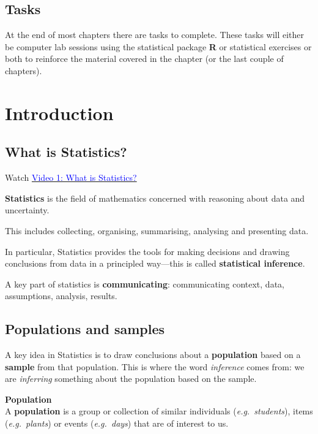 \documentclass[
]{book}
\begin{document}
\hypertarget{tasks}{%
\section*{Tasks}\label{tasks}}

At the end of most chapters there are tasks to complete. These tasks will either be computer lab sessions using the statistical package \textbf{R} or statistical exercises or both to reinforce the material covered in the chapter (or the last couple of chapters).

\hypertarget{intro}{%
\chapter{Introduction}\label{intro}}

\hypertarget{intro_stats}{%
\section{What is Statistics?}\label{intro_stats}}

Watch \href{https://mediaspace.nottingham.ac.uk/media/What+is+Statistics+FINAL+VERSION/1_uu88cciu}{\textcolor{blue}{Video 1: What is Statistics?}}

\textbf{Statistics} is the field of mathematics concerned with reasoning about data and uncertainty.

This includes collecting, organising, summarising, analysing and presenting data.

In particular, Statistics provides the tools for making decisions and drawing conclusions from data in a principled way---this is called \textbf{statistical inference}.

A key part of statistics is \textbf{communicating}: communicating context, data, assumptions, analysis, results.

\hypertarget{intro_population}{%
\section{Populations and samples}\label{intro_population}}

A key idea in Statistics is to draw conclusions about a \textbf{population} based
on a \textbf{sample} from that population. This is where the word \emph{inference} comes from:
we are \emph{inferring} something about the population based on the sample.

\leavevmode{}%
{\textbf{Population}}\\
A \textbf{population} is a group or collection of similar individuals (\emph{e.g.~students}), items (\emph{e.g.~plants}) or events (\emph{e.g.~days}) that are of interest to us.
\end{document}
